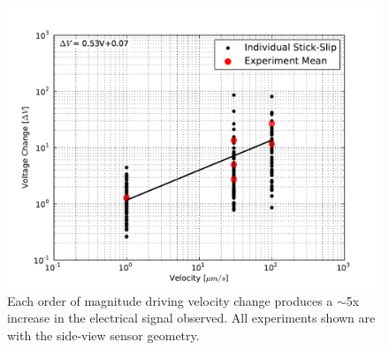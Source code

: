 \clearpage

\begin{figure}
\includegraphics[width=30pc]{chap_electrical/vchange_velocity.pdf}
\caption{Each order of magnitude driving velocity change produces a $\sim$5x increase in the electrical signal observed.  All experiments shown are with the side-view sensor geometry.}
\label{voltage_velocity}
\end{figure}

\clearpage

